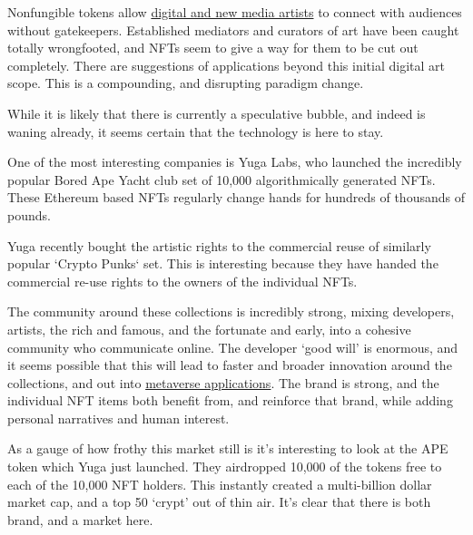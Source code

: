 Nonfungible tokens allow \href{https://en.wikipedia.org/wiki/List_of_most_expensive_non-fungible_tokens}{digital and new media artists} to connect with audiences without gatekeepers. Established mediators and curators of art have been caught totally wrongfooted, and NFTs seem to give a way for them to be cut out completely. There are suggestions of applications beyond this initial digital art scope. This is a compounding, and disrupting paradigm change.\par
While it is likely that there is currently a speculative bubble, and indeed is waning already, it seems certain that the technology is here to stay.\par
One of the most interesting companies is Yuga Labs, who launched the incredibly popular Bored Ape Yacht club set of 10,000 algorithmically generated NFTs. These Ethereum based NFTs regularly change hands for hundreds of thousands of pounds.\par
Yuga recently bought the artistic rights to the commercial reuse of similarly popular `Crypto Punks` set. This is interesting because they have handed the commercial re-use rights to the owners of the individual NFTs. \par
The community around these collections is incredibly strong, mixing developers, artists, the rich and famous, and the fortunate and early, into a cohesive community who communicate online. The developer `good will' is enormous, and it seems possible that this will lead to faster and broader innovation around the collections, and out into \href{https://twitter.com/yugalabs/status/1505014986556551172?}{metaverse applications}. The brand is strong, and the individual NFT items both benefit from, and reinforce that brand, while adding personal narratives and human interest.\par 
As a gauge of how frothy this market still is it's interesting to look at the APE token which Yuga just launched. They airdropped 10,000 of the tokens free to each of the 10,000 NFT holders. This instantly created a multi-billion dollar market cap, and a top 50 `crypt' out of thin air. It's clear that there is both brand, and a market here.\par



